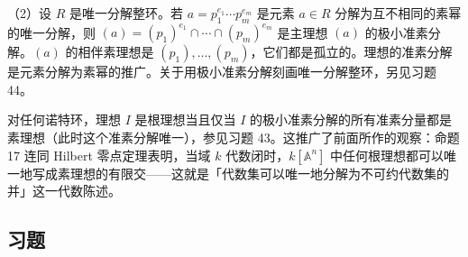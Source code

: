 （2）设 \(R\) 是唯一分解整环。若 \(a = p_1^{e_1}\cdots p_m^{e_m}\) 是元素 \(a \in R\) 分解为互不相同的素幂的唯一分解，则 \((a) = (p_1)^{e_1} \cap \cdots \cap (p_m)^{e_m}\) 是主理想 \((a)\) 的极小准素分解。\((a)\) 的相伴素理想是 \((p_1), \ldots, (p_m)\)，它们都是孤立的。理想的准素分解是元素分解为素幂的推广。关于用极小准素分解刻画唯一分解整环，另见习题 44。

对任何诺特环，理想 \(I\) 是根理想当且仅当 \(I\) 的极小准素分解的所有准素分量都是素理想（此时这个准素分解唯一），参见习题 43。这推广了前面所作的观察：命题 17 连同 Hilbert 零点定理表明，当域 \(k\) 代数闭时，\(k[\mathbb{A}^n]\) 中任何根理想都可以唯一地写成素理想的有限交——这就是「代数集可以唯一地分解为不可约代数集的并」这一代数陈述。

\subsection*{习题}

